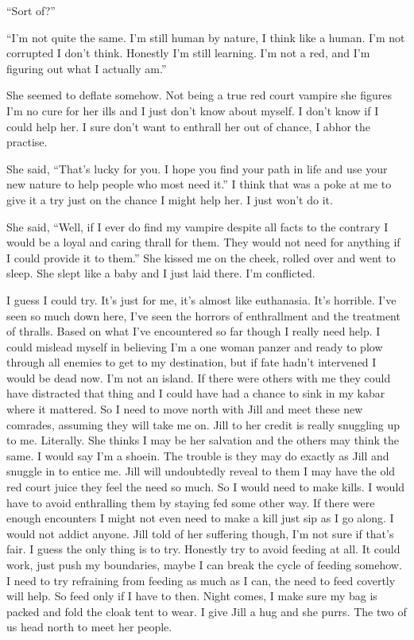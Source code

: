 ``Sort of?''

``I'm not quite the same. I'm still human by nature, I think like a human. I'm not corrupted I don't think. Honestly I'm still learning. I'm not a red, and I'm figuring out what I actually am.''

She seemed to deflate somehow. Not being a true red court vampire she figures I'm no cure for her ills and I just don't know about myself. I don't know if I could help her. I sure don't want to enthrall her out of chance, I abhor the practise.

She said, ``That's lucky for you. I hope you find your path in life and use your new nature to help people who most need it.'' I think that was a poke at me to give it a try just on the chance I might help her. I just won't do it.

She said, ``Well, if I ever do find my vampire despite all facts to the contrary I would be a loyal and caring thrall for them. They would not need for anything if I could provide it to them.'' She kissed me on the cheek, rolled over and went to sleep. She slept like a baby and I just laid there. I'm conflicted.

I guess I could try. It's just for me, it's almost like euthanasia. It's horrible. I've seen so much down here, I've seen the horrors of enthrallment and the treatment of thralls. 
Based on what I've encountered so far though I really need help. I could mislead myself in believing I'm a one woman panzer and ready to plow through all enemies to get to my destination, but if fate hadn't intervened I would be dead now. I'm not an island. If there were others with me they could have distracted that thing and I could have had a chance to sink in my kabar where it mattered.
So I need to move north with Jill and meet these new comrades, assuming they will take me on.
Jill to her credit is really snuggling up to me. Literally. She thinks I may be her salvation and the others may think the same. I would say I'm a shoein.
The trouble is they may do exactly as Jill and snuggle in to entice me. Jill will undoubtedly reveal to them I may have the old red court juice they feel the need so much.
So I would need to make kills. I would have to avoid enthralling them by staying fed some other way. If there were enough encounters I might not even need to make a kill just sip as I go along. I would not addict anyone.
Jill told of her suffering though, I'm not sure if that's fair.
I guess the only thing is to try. Honestly try to avoid feeding at all. It could work, just push my boundaries, maybe I can break the cycle of feeding somehow.
I need to try refraining from feeding as much as I can, the need to feed covertly will help.
So feed only if I have to then.
Night comes, I make sure my bag is packed and fold the cloak tent to wear. I give Jill a hug and she purrs. The two of us head north to meet her people.

